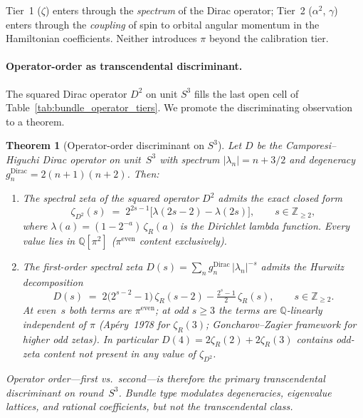 \documentclass[aps,pra,twocolumn,superscriptaddress,longbibliography]{revtex4-2}
\newtheorem{theorem}{Theorem}
\begin{document}
\noindent Tier~1 ($\zeta$) enters through the \emph{spectrum} of the
Dirac operator; Tier~2 ($\alpha^2$, $\gamma$) enters through the
\emph{coupling} of spin to orbital angular momentum in the Hamiltonian
coefficients.  Neither introduces $\pi$ beyond the calibration tier.

\paragraph{Operator-order as transcendental discriminant.}
The squared Dirac operator $D^2$ on unit $S^3$ fills the last open
cell of Table~\ref{tab:bundle_operator_tiers}.  We promote the
discriminating observation to a theorem.

\begin{theorem}[Operator-order discriminant on $S^3$]
\label{thm:operator_order}
Let $D$ be the Camporesi--Higuchi Dirac operator on unit~$S^3$
with spectrum $|\lambda_n| = n + 3/2$ and degeneracy
$g_n^{\mathrm{Dirac}} = 2(n+1)(n+2)$.  Then:
\begin{enumerate}
\item The spectral zeta of the squared operator $D^2$ admits the
exact closed form
\begin{equation}\label{eq:zeta_d2}
  \zeta_{D^2}(s)
  \;=\; 2^{2s-1}\bigl[\lambda(2s{-}2) - \lambda(2s)\bigr],
  \qquad s \in \mathbb{Z}_{\ge 2},
\end{equation}
where $\lambda(a) = (1 - 2^{-a})\,\zeta_R(a)$ is the Dirichlet lambda
function.  Every value lies in $\mathbb{Q}[\pi^2]$ ($\pi^{\mathrm{even}}$
content exclusively).
\item The first-order spectral zeta $D(s) = \sum_n
g_n^{\mathrm{Dirac}}\,|\lambda_n|^{-s}$ admits the Hurwitz
decomposition
\begin{equation}\label{eq:hurwitz_discriminant}
  D(s) \;=\; 2\bigl(2^{s-2}-1\bigr)\,\zeta_R(s{-}2)
           - \tfrac{2^s - 1}{2}\,\zeta_R(s),
  \qquad s \in \mathbb{Z}_{\ge 2}.
\end{equation}
At even~$s$ both terms are $\pi^{\mathrm{even}}$; at odd $s \ge 3$
the terms are $\mathbb{Q}$-linearly independent of $\pi$
(Ap\'ery~1978 for $\zeta_R(3)$; Goncharov--Zagier framework for
higher odd zetas).  In particular $D(4) = 2\zeta_R(2) + 2\zeta_R(3)$
contains odd-zeta content not present in any value of $\zeta_{D^2}$.
\end{enumerate}
Operator order---first vs.\ second---is therefore the primary
transcendental discriminant on round~$S^3$.  Bundle type modulates
degeneracies, eigenvalue lattices, and rational coefficients, but
not the transcendental class.
\end{theorem}
\end{document}
